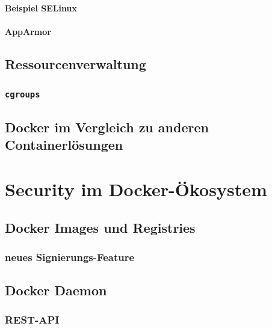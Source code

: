\documentclass[11pt,a4paper,oneside]{report}
\begin{document}
			\subsubsection{Beispiel SELinux}
      \subsubsection{AppArmor}
	\section{Ressourcenverwaltung}
		\subsection{\texttt{cgroups}}
    \label{secCgroups}
	\section{Docker im Vergleich zu anderen Containerlösungen}
\chapter{Security im Docker-Ökosystem}
  \section{Docker Images und Registries}
		\subsection{neues Signierungs-Feature}
	\section{Docker Daemon}
		\subsection{REST-API}
\end{document}
